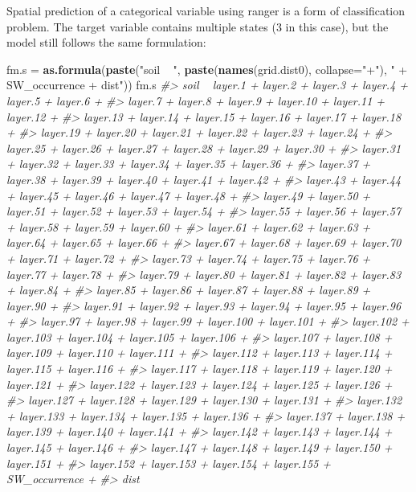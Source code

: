 \documentclass[graybox,natbib,nospthms,UStrade]{svmono}
\newenvironment{Shaded}{\begin{snugshade}}{\end{snugshade}}
\newcommand{\CommentTok}[1]{\textcolor[rgb]{0.37,0.37,0.37}{\textit{#1}}}
\newcommand{\DataTypeTok}[1]{\textcolor[rgb]{0.27,0.27,0.27}{#1}}
\newcommand{\KeywordTok}[1]{\textcolor[rgb]{0.27,0.27,0.27}{\textbf{#1}}}
\newcommand{\NormalTok}[1]{#1}
\newcommand{\StringTok}[1]{\textcolor[rgb]{0.5,0.5,0.5}{#1}}
\begin{document}
Spatial prediction of a categorical variable using ranger is a form of classification problem. The target variable contains multiple states (3 in this case), but the model still follows the same formulation:

\begin{Shaded}
\begin{Highlighting}[]
\NormalTok{fm.s =}\StringTok{ }\KeywordTok{as.formula}\NormalTok{(}\KeywordTok{paste}\NormalTok{(}\StringTok{"soil ~ "}\NormalTok{, }\KeywordTok{paste}\NormalTok{(}\KeywordTok{names}\NormalTok{(grid.dist0), }\DataTypeTok{collapse=}\StringTok{"+"}\NormalTok{), }
                        \StringTok{" + SW_occurrence + dist"}\NormalTok{))}
\NormalTok{fm.s}
\CommentTok{#> soil ~ layer.1 + layer.2 + layer.3 + layer.4 + layer.5 + layer.6 + }
\CommentTok{#>     layer.7 + layer.8 + layer.9 + layer.10 + layer.11 + layer.12 + }
\CommentTok{#>     layer.13 + layer.14 + layer.15 + layer.16 + layer.17 + layer.18 + }
\CommentTok{#>     layer.19 + layer.20 + layer.21 + layer.22 + layer.23 + layer.24 + }
\CommentTok{#>     layer.25 + layer.26 + layer.27 + layer.28 + layer.29 + layer.30 + }
\CommentTok{#>     layer.31 + layer.32 + layer.33 + layer.34 + layer.35 + layer.36 + }
\CommentTok{#>     layer.37 + layer.38 + layer.39 + layer.40 + layer.41 + layer.42 + }
\CommentTok{#>     layer.43 + layer.44 + layer.45 + layer.46 + layer.47 + layer.48 + }
\CommentTok{#>     layer.49 + layer.50 + layer.51 + layer.52 + layer.53 + layer.54 + }
\CommentTok{#>     layer.55 + layer.56 + layer.57 + layer.58 + layer.59 + layer.60 + }
\CommentTok{#>     layer.61 + layer.62 + layer.63 + layer.64 + layer.65 + layer.66 + }
\CommentTok{#>     layer.67 + layer.68 + layer.69 + layer.70 + layer.71 + layer.72 + }
\CommentTok{#>     layer.73 + layer.74 + layer.75 + layer.76 + layer.77 + layer.78 + }
\CommentTok{#>     layer.79 + layer.80 + layer.81 + layer.82 + layer.83 + layer.84 + }
\CommentTok{#>     layer.85 + layer.86 + layer.87 + layer.88 + layer.89 + layer.90 + }
\CommentTok{#>     layer.91 + layer.92 + layer.93 + layer.94 + layer.95 + layer.96 + }
\CommentTok{#>     layer.97 + layer.98 + layer.99 + layer.100 + layer.101 + }
\CommentTok{#>     layer.102 + layer.103 + layer.104 + layer.105 + layer.106 + }
\CommentTok{#>     layer.107 + layer.108 + layer.109 + layer.110 + layer.111 + }
\CommentTok{#>     layer.112 + layer.113 + layer.114 + layer.115 + layer.116 + }
\CommentTok{#>     layer.117 + layer.118 + layer.119 + layer.120 + layer.121 + }
\CommentTok{#>     layer.122 + layer.123 + layer.124 + layer.125 + layer.126 + }
\CommentTok{#>     layer.127 + layer.128 + layer.129 + layer.130 + layer.131 + }
\CommentTok{#>     layer.132 + layer.133 + layer.134 + layer.135 + layer.136 + }
\CommentTok{#>     layer.137 + layer.138 + layer.139 + layer.140 + layer.141 + }
\CommentTok{#>     layer.142 + layer.143 + layer.144 + layer.145 + layer.146 + }
\CommentTok{#>     layer.147 + layer.148 + layer.149 + layer.150 + layer.151 + }
\CommentTok{#>     layer.152 + layer.153 + layer.154 + layer.155 + SW_occurrence + }
\CommentTok{#>     dist}
\end{Highlighting}
\end{Shaded}
\end{document}
